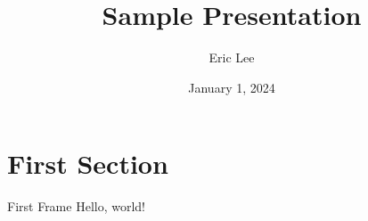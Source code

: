 \documentclass{beamer}
\title{Sample Presentation}
\date{January 1, 2024}
\author{Eric Lee}
\institute{California Institute of Technology}
\begin{document}
\maketitle

\section{First Section}

\begin{frame}{First Frame}
    Hello, world!
\end{frame}
\end{document}

